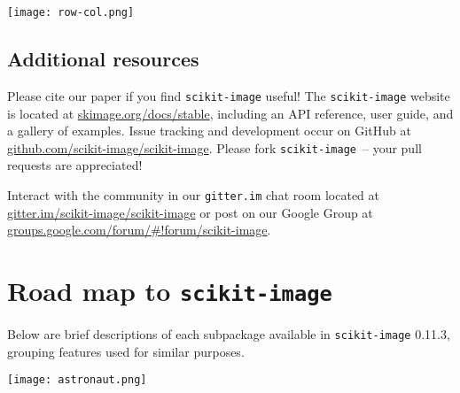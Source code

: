 \documentclass[nohyper, %
               ]{tufte-handout}
\DeclareRobustCommand{\ski}{\texttt{scikit-image}\xspace}
\newcommand{\release}{0.11.3\xspace}
\begin{document}
  \begin{marginfigure}[-1.3cm]%
    \texttt{[image: row-col.png]}
    \label{fig:row-col}
  \end{marginfigure}

\subsection{Additional resources} %
  \label{sub:additional_resources}
  Please cite our paper\cite{van2014scikit} if you find \ski useful! The \ski website is located at \url{skimage.org/docs/stable}, including an API reference, user guide, and a gallery of examples. Issue tracking and development occur on GitHub at \url{github.com/scikit-image/scikit-image}. Please fork \ski\ -- your pull requests are appreciated!\\\medskip

  \noindent
  Interact with the community in our \texttt{gitter.im} chat room located at \url{gitter.im/scikit-image/scikit-image} or post on our Google Group at \url{groups.google.com/forum/#!forum/scikit-image}.

\newpage
\section{Road map to \ski} %
  \label{sec:road_map}
  Below are brief descriptions of each subpackage available in \ski \release, grouping features used for similar purposes.

  \begin{marginfigure}[1.9cm]%
    \texttt{[image: astronaut.png]}
    \label{fig:astronaut}
  \end{marginfigure}
\end{document}
